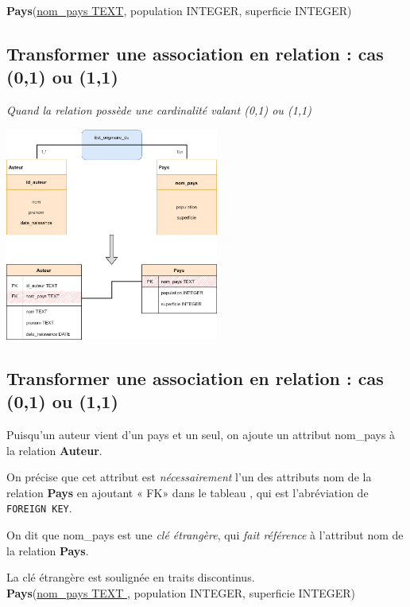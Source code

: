 \textbf{Pays}(\uline{nom\_pays TEXT}, population INTEGER, superficie INTEGER)\\




\subsection{Transformer une association en relation : cas (0,1) ou (1,1)}
\textit{Quand la relation possède une cardinalité valant (0,1) ou (1,1)}
\begin{center}
	\includegraphics[width=7cm]{img/association_vers_relation_1}
\end{center}




\subsection{Transformer une association en relation : cas (0,1) ou (1,1)}

Puisqu'un auteur vient d'un pays et un seul, on ajoute un attribut nom\_pays à la relation \textbf{Auteur}.

On précise que cet attribut est \textit{nécessairement} l'un des attributs nom de la relation \textbf{Pays} en ajoutant « FK»  dans le tableau , qui est l'abréviation de \texttt{FOREIGN KEY}.

On dit que nom\_pays est une \textit{clé étrangère}, qui \textit{fait référence} à l'attribut nom de la relation \textbf{Pays}.

La clé étrangère est soulignée en traits discontinus.\\



\textbf{Pays}(\uline{nom\_pays TEXT }, population INTEGER, superficie INTEGER)\\

